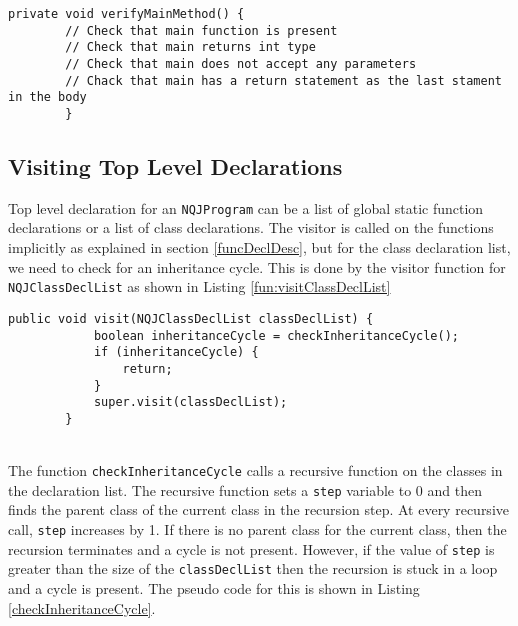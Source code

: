 \documentclass[]{tukportfolio}
\begin{document}
\begin{lstlisting}[caption={\lstinline|verifyMainMethod| method in \lstinline|Analysis|},captionpos=b,label={fun:verifyMainMethod}]
		private void verifyMainMethod() {
		// Check that main function is present
		// Check that main returns int type
		// Check that main does not accept any parameters
		// Chack that main has a return statement as the last stament in the body
		}
\end{lstlisting}

\subsection{Visiting Top Level Declarations}
Top level declaration for an \lstinline|NQJProgram| can be a list of global static function declarations or a list of class declarations. The visitor is called on the functions implicitly as explained in section \ref{funcDeclDesc}, but for the class declaration list, we need to check for an inheritance cycle. This is done by the visitor function for \lstinline|NQJClassDeclList| as shown in Listing \ref{fun:visitClassDeclList}

\begin{lstlisting}[caption={class declaration list visitor in \lstinline|Analysis|},captionpos=b,label={fun:visitClassDeclList}]
		public void visit(NQJClassDeclList classDeclList) {
			boolean inheritanceCycle = checkInheritanceCycle();
			if (inheritanceCycle) {
				return;
			}
			super.visit(classDeclList);
		}
\end{lstlisting}~\\
The function \lstinline|checkInheritanceCycle| calls a recursive function on the classes in the declaration list. The recursive function sets a \lstinline|step| variable to 0 and then finds the parent class of the current class in the recursion step. At every recursive call,  \lstinline|step| increases by 1. If there is no parent class for the current class, then the recursion terminates and a cycle is not present. However, if the value of \lstinline|step| is greater than the size of the \lstinline|classDeclList| then the recursion is stuck in a loop and a cycle is present. The pseudo code for this is shown in Listing \ref{checkInheritanceCycle}.
\end{document}
